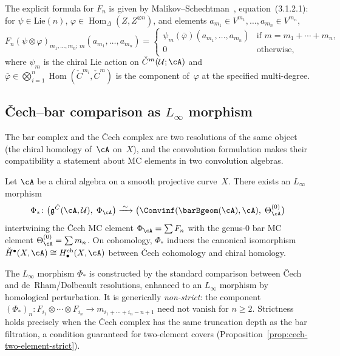 \begin{remark}
\label{rem:operadic-action-map}
The explicit formula for $F_n$ is given by
Malikov--Schechtman~\cite{MS24}, equation~(3.1.2.1):
for $\psi \in \mathrm{Lie}(n)$,
$\varphi \in \operatorname{Hom}_\Delta(Z, Z^{\otimes n})$,
and elements
$a_{m_1} \in V^{m_1}, \ldots,
 a_{m_n} \in V^{m_n}$,
\[
F_n(\psi \otimes \varphi)_{m_1,\ldots,m_n;\,m}(a_{m_1},\ldots,a_{m_n})
=
\begin{cases}
 \psi_m(\bar\varphi)(a_{m_1},\ldots,a_{m_n})
 & \text{if } m = m_1 + \cdots + m_n, \\
 0 & \text{otherwise},
\end{cases}
\]
where $\psi_m$ is the chiral Lie action on
$\check{C}^m(\mathcal{U};\cA)$ and
$\bar\varphi \in \bigotimes_{i=1}^n
\operatorname{Hom}(\check{C}^{m_i},\check{C}^m)$
is the component of~$\varphi$ at the specified multi-degree.
\end{remark}

\subsection{\v{C}ech--bar comparison as $L_\infty$ morphism}
\label{subsec:cech-bar-comparison}

The bar complex and the \v{C}ech complex are two resolutions of the
same object (the chiral homology of~$\cA$ on~$X$), and the
convolution formulation makes their compatibility a statement
about MC elements in two convolution algebras.

\begin{conjecture}
\label{conj:cech-bar-intertwining}
Let $\cA$ be a chiral algebra on a smooth projective curve~$X$.
There exists an $L_\infty$ morphism
\[
\Phi_*\colon
 \bigl(\mathfrak{g}^{\check{C}}(\cA,\mathcal{U}),\;
 \Phi_\cA\bigr)
 \xrightarrow{\;\sim\;}
 \bigl(\Convinf(\barBgeom(\cA),\cA),\;
 \Theta^{(0)}_\cA\bigr)
\]
intertwining the \v{C}ech MC element $\Phi_\cA = \sum F_n$ with the
genus-$0$ bar MC element $\Theta^{(0)}_\cA = \sum m_n$. On
cohomology, $\Phi_*$ induces the canonical isomorphism
$\check{H}^\bullet(X,\cA) \cong H_\bullet^{\mathrm{ch}}(X,\cA)$
between \v{C}ech cohomology and chiral homology.

The $L_\infty$ morphism $\Phi_*$ is constructed by the standard
comparison between \v{C}ech and de~Rham/Dolbeault resolutions,
enhanced to an $L_\infty$ morphism by homological perturbation.
It is generically \emph{non-strict}: the component
$(\Phi_*)_n\colon F_{i_1} \otimes \cdots \otimes F_{i_n}
\to m_{i_1 + \cdots + i_n - n + 1}$
need not vanish for $n \geq 2$. Strictness holds precisely when
the \v{C}ech complex has the same truncation depth as the bar
filtration, a condition guaranteed for two-element covers
(Proposition~\ref{prop:cech-two-element-strict}).
\end{conjecture}

